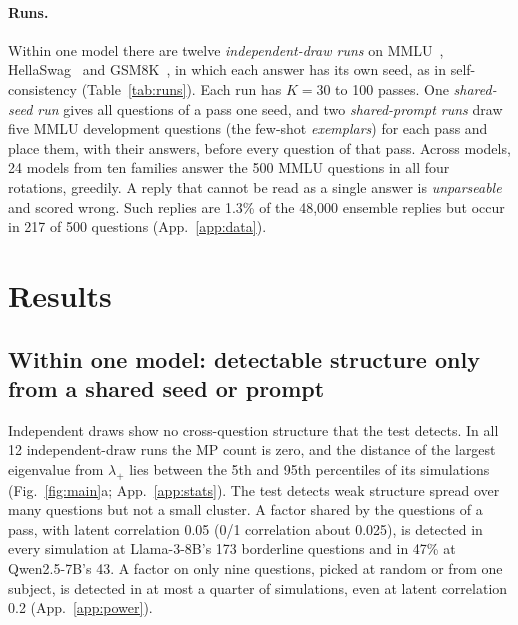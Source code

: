 \documentclass{article}
\theoremstyle{plain}
\theoremstyle{remark}
\begin{document}
\paragraph{Runs.} Within one model there are twelve
\emph{independent-draw runs} on MMLU~\citep{mmlu2021},
HellaSwag~\citep{zellers2019hellaswag} and GSM8K~\citep{gsm8k2021}, in
which each answer has its own seed, as in self-consistency
(Table~\ref{tab:runs}). Each run has $K=30$ to 100 passes. One \emph{shared-seed run} gives all
questions of a pass one seed, and two \emph{shared-prompt runs} draw five MMLU
development questions (the few-shot \emph{exemplars}) for each pass and place them, with their answers,
before every question of that pass. Across models, 24 models from ten
families answer the 500 MMLU questions in all four rotations,
greedily. A reply that cannot be read as a single answer is \emph{unparseable}
and scored wrong. Such replies are 1.3\% of the 48{,}000 ensemble replies but
occur in 217 of 500 questions
(App.~\ref{app:data}).

\section{Results}
\label{sec:results}

\subsection{Within one model: detectable structure only from a shared seed or prompt}
\label{sec:iid}

Independent draws show no cross-question structure that the test
detects. In all 12
independent-draw runs the MP count is zero, and the distance of the
largest eigenvalue from $\lambda_+$ lies between the 5th and 95th
percentiles of its simulations (Fig.~\ref{fig:main}a; App.~\ref{app:stats}).
The test detects weak structure spread over many questions but not a
small cluster. A factor shared by the questions of a pass, with latent
correlation 0.05 (0/1 correlation about 0.025), is detected in every
simulation at Llama-3-8B's 173 borderline questions and in 47\% at
Qwen2.5-7B's 43. A factor on only nine questions, picked at random or
from one subject, is detected in at most a quarter of simulations, even
at latent correlation 0.2 (App.~\ref{app:power}).
\end{document}
